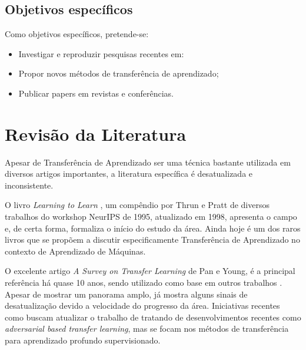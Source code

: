 \documentclass[
12pt, %
a4paper, %
onecolumn, %
]{article}
\begin{document}
\subsection{Objetivos específicos}
Como objetivos específicos, pretende-se:
\begin{itemize}
\item Investigar e reproduzir pesquisas recentes em:
\item Propor novos métodos de transferência de aprendizado;
\item Publicar papers em revistas e conferências.
\end{itemize}


\section{Revisão da Literatura}
Apesar de Transferência de Aprendizado ser uma técnica bastante utilizada em diversos artigos importantes, a literatura específica é desatualizada e inconsistente. 

O livro \textit{Learning to Learn} \cite{Thrun:1998:LL:296635}, um compêndio  por Thrun e Pratt de diversos trabalhos do workshop NeurIPS de 1995, atualizado em 1998, apresenta o campo e, de certa forma, formaliza o início do estudo da área. Ainda hoje é um dos raros livros que se propõem a discutir especificamente Transferência de Aprendizado no contexto de Aprendizado de Máquinas. 

O excelente artigo \textit{A Survey on Transfer Learning} \cite{Pan} de Pan e Young, é a principal referência há quase 10 anos, sendo utilizado como base em outros trabalhos \cite{csurka2017domain, goodfellow,deeptransferlearning}. Apesar de mostrar um panorama amplo, já mostra alguns sinais de desatualização devido a velocidade do progresso da área. Iniciativas recentes como \cite{deeptransferlearning} buscam atualizar o trabalho de \cite{Pan} tratando de desenvolvimentos recentes como \textit{adversarial based transfer learning}, mas se focam nos métodos de transferência para aprendizado profundo supervisionado.
\end{document}
